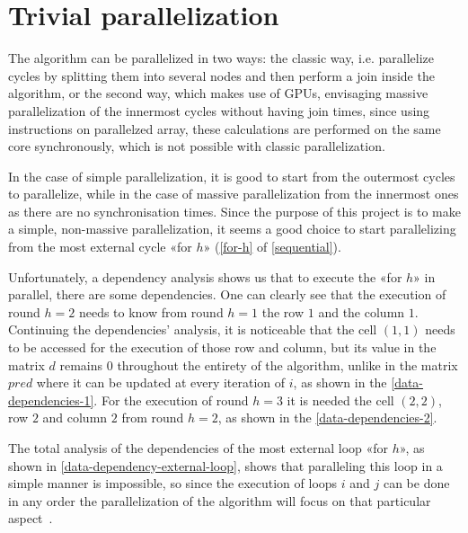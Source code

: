 \section{Trivial parallelization}\label{trivial_parallelization}

The algorithm can be parallelized in two ways: the classic way, i.e. parallelize cycles by splitting them into several nodes and then perform a join inside the algorithm, or the second way, which makes use of GPUs, envisaging massive parallelization of the innermost cycles without having join times, since using instructions on parallelzed array, these calculations are performed on the same core synchronously, which is not possible with classic parallelization. 

In the case of simple parallelization, it is good to start from the outermost cycles to parallelize, while in the case of massive parallelization from the innermost ones as there are no synchronisation times.
Since the purpose of this project is to make a simple, non-massive parallelization, it seems a good choice to start parallelizing from the most external cycle «for \(h\)» (\cref{for-h} of \cref{sequential}).

Unfortunately, a dependency analysis shows us that to execute the «for \(h\)»  in parallel, there are some dependencies. One can clearly see that the execution of round \(h=2\) needs to know from round \(h=1\) the row \(1\) and the column \(1\). Continuing the dependencies' analysis, it is noticeable that the cell \((1,1)\) needs to be accessed for the execution of those row and column, but its value in the matrix \(d\) remains \(0\) throughout the entirety of the algorithm, unlike in the matrix \(pred\) where it can be updated at every iteration of \( i\), as shown in the \cref{data-dependencies-1}.
For the execution of round \(h=3\) it is needed the cell \((2,2)\), row \(2\) and column \(2\) from round \(h=2\), as shown in the \cref{data-dependencies-2}.

The total analysis of the dependencies of the most external loop «for \(h\)», as shown in \cref{data-dependency-external-loop}, shows that paralleling this loop in a simple manner is impossible, so since the execution of loops \(i\) and \(j\) can be done in any order the parallelization of the algorithm will focus on that particular aspect~\cite{rucci}.

